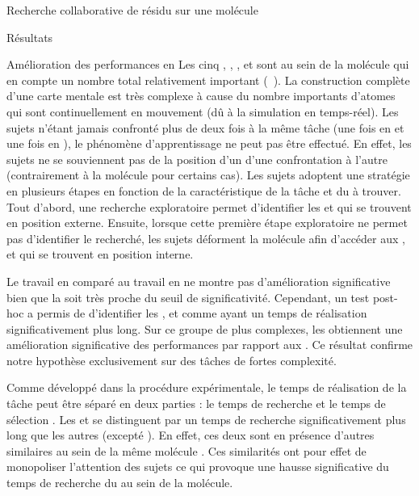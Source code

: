 \documentclass[myfrancais]{mythesis}
\begin{document}
\begin{mychapter}{Recherche collaborative de résidu sur une molécule}
\begin{mysection}{Résultats}
\begin{mysubsection}{Amélioration des performances en }
				Les cinq  , , ,  et  sont au sein de la molécule \myPrion qui en compte un nombre total relativement important (~).
				La construction complète d'une carte mentale est très complexe à cause du nombre importants d'atomes qui sont continuellement en mouvement (dû à la simulation en temps-réel).
				Les sujets n'étant jamais confronté plus de deux fois à la même tâche (une fois en  et une fois en ), le phénomène d'apprentissage ne peut pas être effectué.
				En effet, les sujets ne se souviennent pas de la position d'un  d'une confrontation à l'autre (contrairement à la molécule \myTRPCAGE pour certains cas).
				Les sujets adoptent une stratégie en plusieurs étapes en fonction de la caractéristique de la tâche et du  à trouver.
				Tout d'abord, une recherche exploratoire permet d'identifier les   et  qui se trouvent en position externe.
				Ensuite, lorsque cette première étape exploratoire ne permet pas d'identifier le  recherché, les sujets déforment la molécule afin d'accéder aux  ,  et  qui se trouvent en position interne.

				Le travail en  comparé au travail en  ne montre pas d'amélioration significative bien que la \mypvalue soit très proche du seuil de significativité.
				Cependant, un test post-hoc a permis de d'identifier les  ,  et  comme ayant un temps de réalisation significativement plus long.
				Sur ce groupe de  plus complexes, les  obtiennent une amélioration significative des performances par rapport aux .
				Ce résultat confirme notre hypothèse  exclusivement sur des tâches de fortes complexité.

				Comme développé dans la procédure expérimentale, le temps de réalisation de la tâche peut être séparé en deux parties : le temps de recherche et le temps de sélection .
				Les   et  se distinguent par un temps de recherche significativement plus long que les autres  (excepté ).
				En effet, ces deux  sont en présence d'autres  similaires au sein de la même molécule .
				Ces similarités ont pour effet de monopoliser l'attention des sujets ce qui provoque une hausse significative du temps de recherche du  au sein de la molécule.


\end{mysubsection}
\end{mysection}
\end{mychapter}
\end{document}
